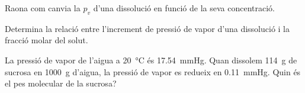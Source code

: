 \begin{exr}{}
    Raona com canvia la $p_v$ d'una dissolució en funció de la seva concentració.
    \end{exr}
    
    \begin{exr}{}
    Determina la relació entre l'increment de pressió de vapor d'una dissolució i la fracció molar del solut.
    \end{exr}
    
    \begin{exr}{}
    La pressió de vapor de l'aigua a \qty{20}{\celsius} és \qty{17.54}{\mmHg}. Quan dissolem \qty{114}{\gram} de sucrosa en \qty{1000}{\gram} d'aigua, la pressió de vapor es redueix en \qty{0.11}{\mmHg}. Quin és el pes molecular de la sucrosa?
    \end{exr}
